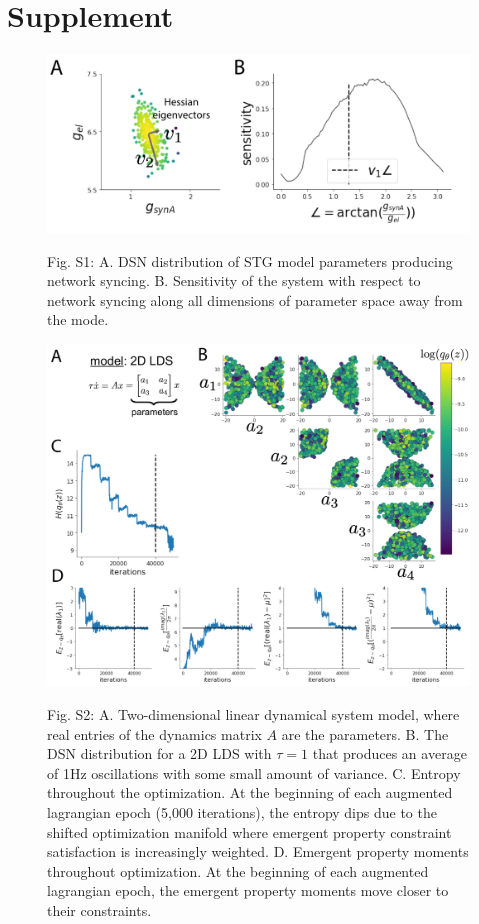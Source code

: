 \documentclass[11pt]{article}
\begin{document}
\appendix

\section{Supplement}

\begin{figure}
\begin{center}
\includegraphics[scale=0.7]{figs/figS1/figS1.pdf}
\end{center}
Fig. S1: A. DSN distribution of STG model parameters producing network syncing.  B. Sensitivity of the system with respect to network syncing along all dimensions of parameter space away from the mode.
\end{figure}


\begin{figure}
\begin{center}
\includegraphics[scale=0.5]{figs/figS2/figS2.pdf}
\end{center}
Fig. S2: A. Two-dimensional linear dynamical system model, where real entries of the dynamics matrix $A$ are the parameters.  B. The DSN distribution for a 2D LDS with $\tau=1$ that produces an average of 1Hz oscillations with some small amount of variance.  C. Entropy throughout the optimization.  At the beginning of each augmented lagrangian epoch (5,000 iterations), the entropy dips due to the shifted optimization manifold where emergent property constraint satisfaction is increasingly weighted.  D. Emergent property moments throughout optimization.  At the beginning of each augmented lagrangian epoch, the emergent property moments move closer to their constraints.
\end{figure}






\end{document}
